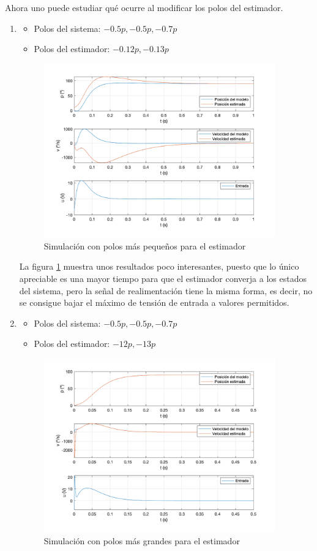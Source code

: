 \documentclass[a4paper, 12pt]{article}
\begin{document}
Ahora uno puede estudiar qué ocurre al modificar los polos del estimador.

\begin{enumerate}
\item 
	\begin{itemize}
		\item Polos del sistema: $-0.5p, -0.5p, -0.7p$
		\item Polos del estimador: $-0.12p, -0.13p$
	\end{itemize}


\begin{figure}[H]
	\centering
	\includegraphics*[height = 7.5cm]{figs/p4/l011}
	\caption{Simulación con polos más pequeños para el estimador} \label{slo}
\end{figure}
La figura \ref{slo} muestra unos resultados poco interesantes, puesto que lo único apreciable es una mayor tiempo para que el estimador converja a los estados del sistema, pero la señal de realimentación tiene la misma forma, es decir, no se consigue bajar el máximo de tensión de entrada a valores permitidos.  
\item 
	\begin{itemize}
		\item Polos del sistema: $-0.5p, -0.5p, -0.7p$
		\item Polos del estimador: $-12p, -13p$
	\end{itemize}

	\begin{figure}[H]
		\centering
		\includegraphics*[height = 7.5cm]{figs/p4/l11}
	
		\caption{Simulación con polos más grandes para el estimador} \label{fas}
	\end{figure}
		

\end{enumerate}
\end{document}
